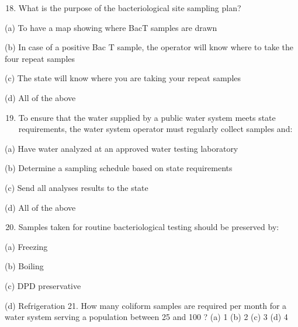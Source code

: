 \documentclass[10pt]{article}
\begin{document}
\begin{enumerate}
  \setcounter{enumi}{17}
  \item What is the purpose of the bacteriological site sampling plan?
\end{enumerate}

(a) To have a map showing where BacT samples are drawn

(b) In case of a positive Bac $\mathrm{T}$ sample, the operator will know where to take the four repeat samples

(c) The state will know where you are taking your repeat samples

(d) All of the above

\begin{enumerate}
  \setcounter{enumi}{18}
  \item To ensure that the water supplied by a public water system meets state requirements, the water system operator must regularly collect samples and:
\end{enumerate}

(a) Have water analyzed at an approved water testing laboratory

(b) Determine a sampling schedule based on state requirements

(c) Send all analyses results to the state

(d) All of the above

\begin{enumerate}
  \setcounter{enumi}{19}
  \item Samples taken for routine bacteriological testing should be preserved by:
\end{enumerate}

(a) Freezing

(b) Boiling

(c) DPD preservative

(d) Refrigeration 21. How many coliform samples are required per month for a water system serving a population between 25 and 100 ?
(a) 1
(b) 2
(c) 3
(d) 4
\end{document}
